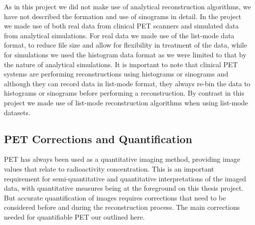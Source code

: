 As in this project we did not make use of analytical reconstruction algorithms, we have not described the formation and use of sinograms in detail. 
In the project we made use of both real data from clinical PET scanners and simulated data from analytical simulations. For real data we made use of the list-mode data format, to reduce file size and allow for flexibility in treatment of the data, while for simulations we used the histogram data format as we were limited to that by the nature of analytical simulations.
It is important to note that clinical PET systems are performing reconstructions using histograms or sinograms and although they can record data in list-mode format, they always re-bin the data to histograms or sinograms before performing a reconstruction. 
By contrast in this project we made use of list-mode reconstruction algorithms when using list-mode datasets.

\subsection{PET Corrections and Quantification}
PET has always been used as a quantitative imaging method, providing image values that relate to radioactivity concentration. This is an important requirement for semi-quantitative and quantitative interpretations of the imaged data, with quantitative measures being at the foreground on this thesis project.
But accurate quantification of images requires corrections that need to be considered before and during the reconstruction process. The main corrections needed for quantifiable PET our outlined here.

